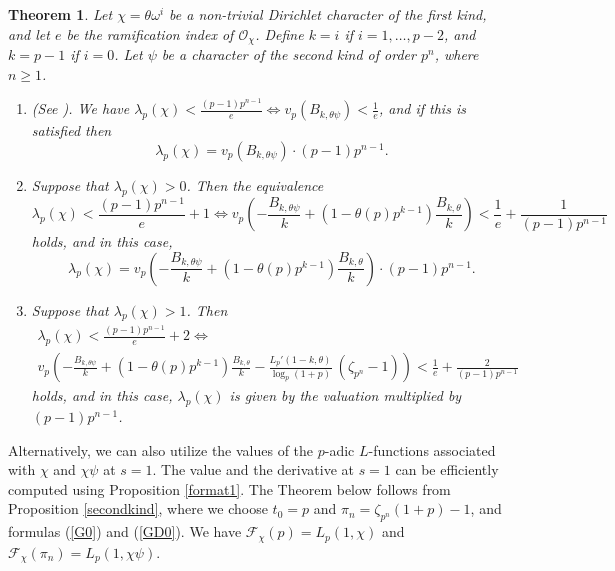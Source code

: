 \documentclass[pdflatex,sn-mathphys-num]{sn-jnl}%
\theoremstyle{plain}
\newtheorem{thm}{Theorem}[section]
\theoremstyle{definition}
\theoremstyle{remark}
\numberwithin{equation}{section}
\begin{document}
\begin{thm} Let $\chi = \theta \omega^i$ be a non-trivial Dirichlet character of the first kind, and let $e$ be the ramification index of $\mathcal{O}_{\chi}$. Define $k=i$ if $i=1,\dots,p-2$, and $k=p-1$ if $i=0$. Let $\psi$ be a character of the second kind of order $p^n$, where $n\geq 1$. 
\begin{enumerate}
\item[(i)] (See \cite{ErMe}). We have
$ \lambda_p(\chi) < \frac{(p-1)p^{n-1}}{e}   \Longleftrightarrow v_p(B_{k,\theta \psi} ) <  \frac{1}{e} $,
and if this  is satisfied then
$$  \lambda_p(\chi) = v_p(B_{k,\theta \psi} ) \cdot (p-1)p^{n-1} . $$

\item[(ii)]  Suppose that $\lambda_p(\chi)>0$. Then the equivalence 
$$\lambda_p(\chi) < \frac{(p-1)p^{n-1}}{e} + 1 \Longleftrightarrow v_p\left( - \frac{B_{k,\theta \psi}}{k} + (1-\theta(p)p^{k-1}) \frac{B_{k,\theta}}{k}\right) < \frac{1}{e} + \frac{1}{(p-1)p^{n-1}}$$
holds, and in this case, 
$$  \lambda_p(\chi) = v_p\left(- \frac{B_{k,\theta \psi}}{k} + (1-\theta(p)p^{k-1}) \frac{B_{k,\theta }}{k} \right) \cdot (p-1)p^{n-1} . $$

\item[(iii)] Suppose that $\lambda_p(\chi)>1$.  Then 
$$
\begin{multlined} \lambda_p(\chi) < \frac{(p-1)p^{n-1} }{e} + 2 \Longleftrightarrow \\  
v_p \left( - \frac{B_{k,\theta \psi}}{k} + (1-\theta(p)p^{k-1}) \frac{B_{k,\theta }}{k} - \frac{L_p'(1-k,\theta )}{\log_p(1+p)}\: (\zeta_{p^n}-1) \right) 
< \frac{1}{e} + \frac{2}{(p-1)p^{n-1}}
\end{multlined}
$$
holds, and in this case, $\lambda_p(\chi)$ is given by the valuation multiplied by $(p-1)p^{n-1}$.


\end{enumerate}
\label{thm-val}
\end{thm} 

Alternatively, we can also utilize the values of the $p$-adic $L$-functions associated with $\chi$ and $\chi\psi$ at $s=1$. The value and the derivative at $s=1$  can be efficiently computed using Proposition \ref{format1}.
The Theorem below follows from Proposition \ref{secondkind}, where we choose $t_0=p$ and $\pi_n = \zeta_{p^n}(1+p)-1$, and formulas (\ref{G0}) and (\ref{GD0}). We have $\mathcal{F}_{\chi}(p)=L_p(1,\chi)$ and $\mathcal{F}_{\chi}(\pi_n)=L_p(1,\chi \psi)$.
\end{document}

